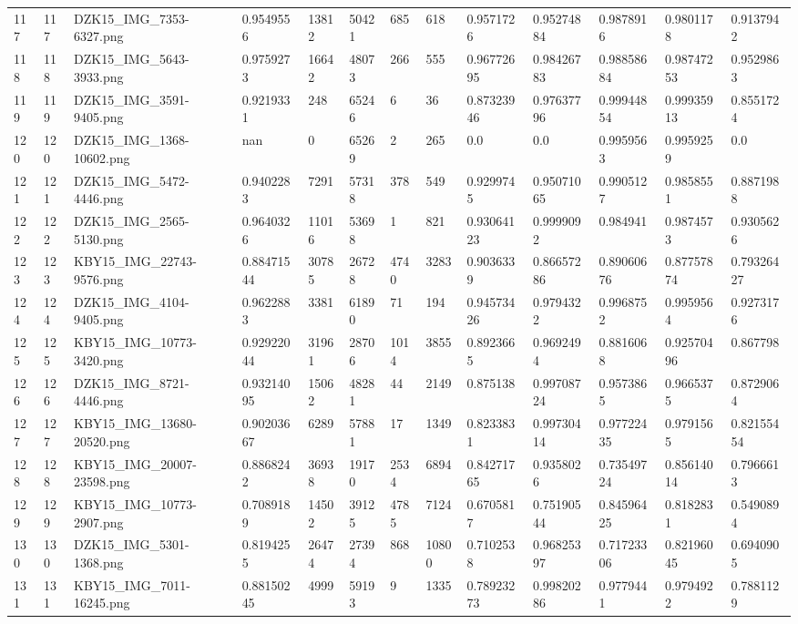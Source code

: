 \documentclass[11pt, a4paper, twoside]{report}
\begin{document}
\begin{longtable}[c]{@{}lllllllllllll@{}}
117 & 117 & DZK15\_IMG\_7353-6327.png & 0.9549556 & 13812 & 50421 & 685 & 618 & 0.9571726 & 0.95274884 & 0.9878916 & 0.9801178 & 0.9137942 \\
118 & 118 & DZK15\_IMG\_5643-3933.png & 0.9759273 & 16642 & 48073 & 266 & 555 & 0.96772695 & 0.98426783 & 0.98858684 & 0.98747253 & 0.9529863 \\
119 & 119 & DZK15\_IMG\_3591-9405.png & 0.9219331 & 248 & 65246 & 6 & 36 & 0.87323946 & 0.97637796 & 0.99944854 & 0.99935913 & 0.8551724 \\
120 & 120 & DZK15\_IMG\_1368-10602.png & nan & 0 & 65269 & 2 & 265 & 0.0 & 0.0 & 0.9959563 & 0.9959259 & 0.0 \\
121 & 121 & DZK15\_IMG\_5472-4446.png & 0.9402283 & 7291 & 57318 & 378 & 549 & 0.9299745 & 0.95071065 & 0.9905127 & 0.9858551 & 0.8871988 \\
122 & 122 & DZK15\_IMG\_2565-5130.png & 0.9640326 & 11016 & 53698 & 1 & 821 & 0.93064123 & 0.9999092 & 0.984941 & 0.9874573 & 0.9305626 \\
123 & 123 & KBY15\_IMG\_22743-9576.png & 0.88471544 & 30785 & 26728 & 4740 & 3283 & 0.9036339 & 0.86657286 & 0.89060676 & 0.87757874 & 0.79326427 \\
124 & 124 & DZK15\_IMG\_4104-9405.png & 0.9622883 & 3381 & 61890 & 71 & 194 & 0.94573426 & 0.9794322 & 0.9968752 & 0.9959564 & 0.9273176 \\
125 & 125 & KBY15\_IMG\_10773-3420.png & 0.92922044 & 31961 & 28706 & 1014 & 3855 & 0.8923665 & 0.9692494 & 0.8816068 & 0.92570496 & 0.867798 \\
126 & 126 & DZK15\_IMG\_8721-4446.png & 0.93214095 & 15062 & 48281 & 44 & 2149 & 0.875138 & 0.99708724 & 0.9573865 & 0.9665375 & 0.8729064 \\
127 & 127 & KBY15\_IMG\_13680-20520.png & 0.90203667 & 6289 & 57881 & 17 & 1349 & 0.8233831 & 0.99730414 & 0.97722435 & 0.9791565 & 0.82155454 \\
128 & 128 & KBY15\_IMG\_20007-23598.png & 0.8868242 & 36938 & 19170 & 2534 & 6894 & 0.84271765 & 0.9358026 & 0.73549724 & 0.85614014 & 0.7966613 \\
129 & 129 & KBY15\_IMG\_10773-2907.png & 0.7089189 & 14502 & 39125 & 4785 & 7124 & 0.6705817 & 0.75190544 & 0.84596425 & 0.8182831 & 0.5490894 \\
130 & 130 & DZK15\_IMG\_5301-1368.png & 0.8194255 & 26474 & 27394 & 868 & 10800 & 0.7102538 & 0.96825397 & 0.71723306 & 0.82196045 & 0.6940905 \\
131 & 131 & KBY15\_IMG\_7011-16245.png & 0.88150245 & 4999 & 59193 & 9 & 1335 & 0.78923273 & 0.99820286 & 0.9779441 & 0.9794922 & 0.7881129 \\

\end{longtable}
\end{document}
